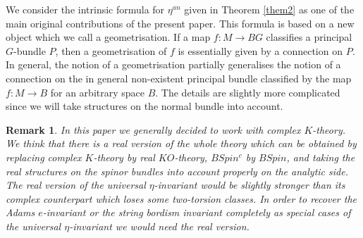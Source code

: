 \documentclass[12pt]{article}
\newtheorem{rem}[theorem]{Remark}
\newcommand{\cG}{{\mathcal{G}}}
\newcommand{\bV}{{\mathbf{V}}}
\begin{document}
We consider the intrinsic formula  for $\eta^{an}$ given in Theorem \ref{them2} as one of the main original contributions of the present paper. This formula is based on a new object which we call a geometrisation.
If a map $f:M\to BG$  classifies a principal $G$-bundle $P$, then a geometrisation of $f$ is essentially given by a connection on $P$. In general,
the notion of a geometrisation  partially generalises
the notion of a connection on the in general non-existent principal bundle classified by the map $f:M\to B$ for an arbitrary space $B$. The details are slightly more complicated since
we will take structures on the normal bundle into account. 

\begin{rem}{\rm
In this paper we generally decided to work with complex $K$-theory.
We think that there is a real version of the whole theory which can be obtained by replacing
complex $K$-theory by real $KO$-theory, $BSpin^{c}$ by $BSpin$,
and taking the real structures on the spinor bundles into account properly on the analytic side.
The real version of the universal $\eta$-invariant would be slightly stronger than its complex counterpart
which loses some two-torsion classes. In order to recover the Adams $e$-invariant or the string bordism invariant \cite{2009arXiv0912.4875B} completely as special cases of the universal $\eta$-invariant  we would need the real version.}
\end{rem}
 
\end{document}
